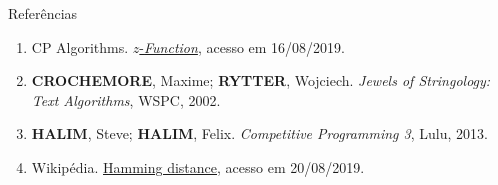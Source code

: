 \begin{frame}[fragile]{Referências}

    \begin{enumerate}
        \item CP Algorithms. \href{https://cp-algorithms.com/string/z-function.html}{$z$-{\it Function}}, acesso em 16/08/2019.

        \item \textbf{CROCHEMORE}, Maxime; \textbf{RYTTER}, Wojciech. \textit{Jewels of Stringology: Text Algorithms}, WSPC, 2002.

        \item \textbf{HALIM}, Steve; \textbf{HALIM}, Felix. \textit{Competitive Programming 3}, Lulu, 2013.

        \item Wikipédia. \href{https://en.wikipedia.org/wiki/Hamming_distance}{Hamming distance},
            acesso em 20/08/2019.
    \end{enumerate}

\end{frame}
